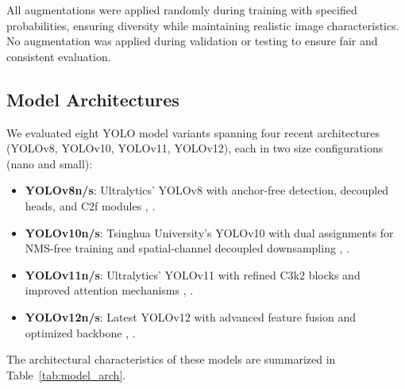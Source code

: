 All augmentations were applied randomly during training with specified probabilities, ensuring diversity while maintaining realistic image characteristics. No augmentation was applied during validation or testing to ensure fair and consistent evaluation.

\subsection{Model Architectures}

We evaluated eight YOLO model variants spanning four recent architectures (YOLOv8, YOLOv10, YOLOv11, YOLOv12), each in two size configurations (nano and small):

\begin{itemize}
\item \textbf{YOLOv8n/s}: Ultralytics' YOLOv8 with anchor-free detection, decoupled heads, and C2f modules \cite{14}, \cite{29}.
\item \textbf{YOLOv10n/s}: Tsinghua University's YOLOv10 with dual assignments for NMS-free training and spatial-channel decoupled downsampling \cite{21}, \cite{33}.
\item \textbf{YOLOv11n/s}: Ultralytics' YOLOv11 with refined C3k2 blocks and improved attention mechanisms \cite{4}, \cite{25}.
\item \textbf{YOLOv12n/s}: Latest YOLOv12 with advanced feature fusion and optimized backbone \cite{24}, \cite{31}.
\end{itemize}

The architectural characteristics of these models are summarized in Table~\ref{tab:model_arch}.

\begin{table}[!t]
\caption{Model Architecture Characteristics}
\label{tab:model_arch}
\centering
{}
\end{table}

